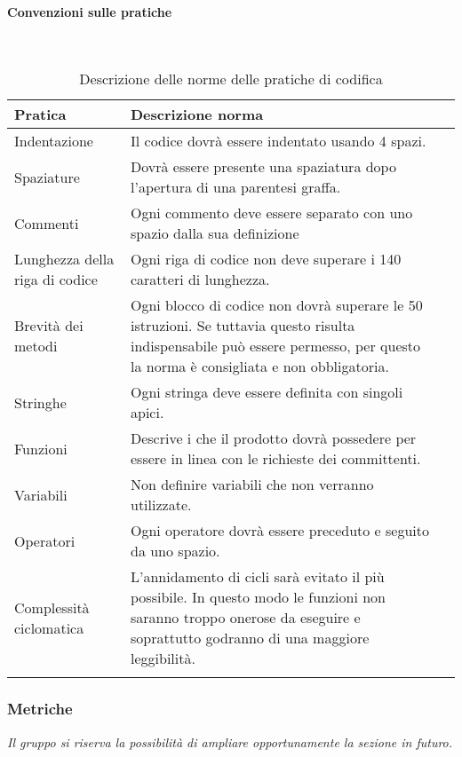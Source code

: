 \paragraph{Convenzioni sulle pratiche}
\
{
	\setlength{\freewidth}{\dimexpr\textwidth-0\tabcolsep}
	\renewcommand{\arraystretch}{1.5}
	\setlength{\aboverulesep}{0pt}
	\setlength{\belowrulesep}{0pt}
	\begin{longtable}{L{.210\freewidth} L{.6\freewidth} L{.080\freewidth}}
		\toprule 
		\textbf{Pratica} & \textbf{Descrizione norma} \\
		\toprule
		\endhead		
		Indentazione & Il codice dovrà essere indentato usando 4 spazi. \\ 
		Spaziature & Dovrà essere presente una spaziatura dopo l'apertura di una parentesi graffa.  \\
		Commenti & Ogni commento deve essere separato con uno spazio dalla sua definizione \\ 
		Lunghezza della riga di codice & Ogni riga di codice non deve superare i 140 caratteri di lunghezza. \\
		Brevità dei metodi & Ogni blocco di codice non dovrà superare le 50 istruzioni. Se tuttavia questo risulta indispensabile può essere permesso, per questo la norma è consigliata e non obbligatoria.\\ 	
		Stringhe & Ogni stringa deve essere definita con singoli apici. \\
		Funzioni & Descrive i  che il prodotto dovrà possedere per essere in linea con le richieste dei committenti.\\ 	
		Variabili & Non definire variabili che non verranno utilizzate.\\ 	
		Operatori & Ogni operatore dovrà essere preceduto e seguito da uno spazio.\\ 	
		Complessità ciclomatica & L'annidamento di cicli sarà evitato il più possibile. In questo modo le funzioni non saranno troppo onerose da eseguire e soprattutto godranno di una maggiore leggibilità. \\  			
		\bottomrule
		\hiderowcolors
		\caption{Descrizione delle norme delle pratiche di codifica}
	\end{longtable}
}
\subsubsection{Metriche}
\textit{Il gruppo si riserva la possibilità di ampliare opportunamente la sezione in futuro.}
